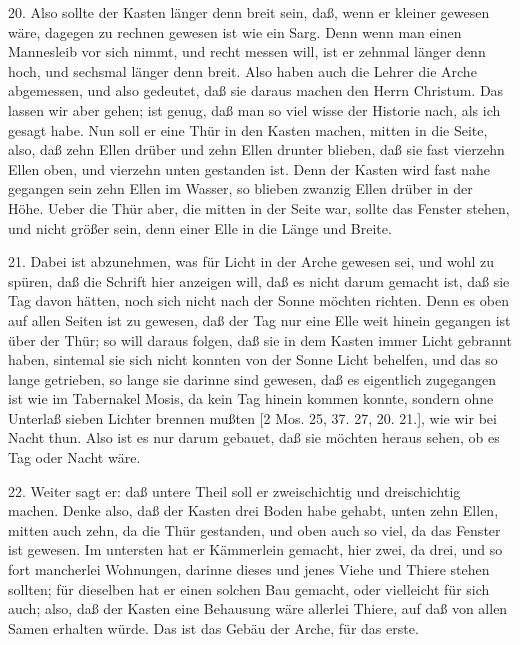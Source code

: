 20. Also sollte der Kasten länger denn breit sein, daß, wenn er kleiner gewesen wäre, dagegen zu rechnen gewesen ist wie ein Sarg. Denn wenn man einen Mannesleib vor sich nimmt, und recht messen will, ist er zehnmal länger denn hoch, und sechsmal länger denn breit. Also haben auch die Lehrer die Arche abgemessen, und also gedeutet, daß sie daraus machen den Herrn Christum. Das lassen wir aber gehen; ist genug, daß man so viel wisse der Historie nach, als ich gesagt habe. Nun soll er eine Thür in den Kasten machen, mitten in die Seite, also, daß zehn Ellen drüber und zehn Ellen drunter blieben, daß sie fast vierzehn Ellen oben, und vierzehn unten gestanden ist. Denn der Kasten wird fast nahe gegangen sein zehn Ellen im Wasser, so blieben zwanzig Ellen drüber in der Höhe. Ueber die Thür aber, die mitten in der Seite war, sollte das Fenster stehen, und nicht größer sein, denn einer Elle in die Länge und Breite.

21. Dabei ist abzunehmen, was für Licht in der Arche gewesen sei, und wohl zu spüren, daß die Schrift hier anzeigen will, daß es nicht darum gemacht ist, daß sie Tag davon hätten, noch sich nicht nach der Sonne möchten richten. Denn es oben auf allen Seiten ist zu gewesen, daß der Tag nur eine Elle weit hinein gegangen ist über der Thür; so will daraus folgen, daß sie in dem Kasten immer Licht gebrannt haben, sintemal sie sich nicht konnten von der Sonne Licht behelfen, und das so lange getrieben, so lange sie darinne sind gewesen, daß es eigentlich zugegangen ist wie im Tabernakel Mosis, da kein Tag hinein kommen konnte, sondern ohne Unterlaß sieben Lichter brennen mußten [2 Mos. 25, 37. 27, 20. 21.], wie wir bei Nacht thun. Also ist es nur darum gebauet, daß sie möchten heraus sehen, ob es Tag oder Nacht wäre.

22. Weiter sagt er: daß untere Theil soll er zweischichtig und dreischichtig machen. Denke also, daß der Kasten drei Boden habe gehabt, unten zehn Ellen, mitten auch zehn, da die Thür gestanden, und oben auch so viel, da das Fenster ist gewesen. Im untersten hat er Kämmerlein gemacht, hier zwei, da drei, und so fort mancherlei Wohnungen, darinne dieses und jenes Viehe und Thiere stehen sollten; für dieselben hat er einen solchen Bau gemacht, oder vielleicht für sich auch; also, daß der Kasten eine Behausung wäre allerlei Thiere, auf daß von allen Samen erhalten würde. Das ist das Gebäu der Arche, für das erste.

